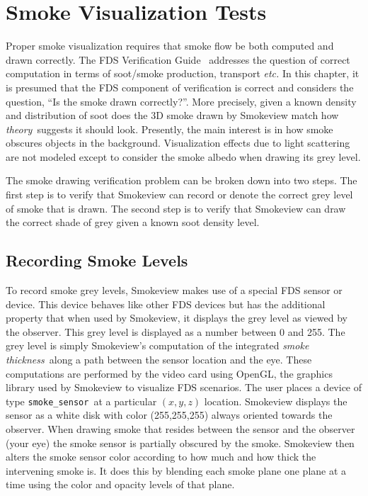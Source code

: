 \documentclass[11pt,twoside]{book}
\begin{document}
\chapter{Smoke Visualization Tests}

Proper smoke visualization requires that smoke flow be both computed and drawn correctly.
The FDS Verification Guide~\cite{FDS_Verification_Guide_5} addresses the question of correct
computation in terms of soot/smoke production, transport {\em etc.}  In this chapter, it is presumed that the FDS component of verification is correct and considers the question, ``Is the smoke drawn correctly?''.  More precisely, given a known density and distribution of soot does the 3D smoke drawn by Smokeview match how {\em theory}\ suggests it should look.  Presently, the main interest is in how smoke obscures objects in the background.  Visualization effects due to light scattering are not modeled except to consider the smoke albedo when drawing its grey level.

The smoke drawing verification problem can be broken down into two steps.  The first step is to verify that Smokeview can record or denote the correct grey level of smoke that is drawn.
The second step is to verify that Smokeview can draw the correct shade of grey given a known soot density level.

\section{Recording Smoke Levels}
To record smoke grey levels, Smokeview makes use of a special FDS sensor or device.
This device behaves like other FDS devices but has the additional property that when used by Smokeview, it displays the grey level as viewed by the observer.  This grey level is displayed as a number between 0 and 255.  The grey level is simply Smokeview's computation of the integrated {\em smoke thickness}\ along a path between the sensor location and the eye.  These computations are performed by the video card using OpenGL, the graphics library used by Smokeview to visualize FDS scenarios.  The user places a device of type {\tt smoke\_sensor}\ at a particular $(x, y, z)$ location.
Smokeview displays the sensor as a white disk with color (255,255,255) always oriented towards the observer. When drawing smoke that resides between the sensor and the observer (your eye) the smoke sensor is partially obscured by the smoke.  Smokeview then alters the smoke sensor color according to how much and how thick the intervening smoke is.  It does this by blending each smoke plane one plane at a time using the color and opacity levels of that plane.
\end{document}

